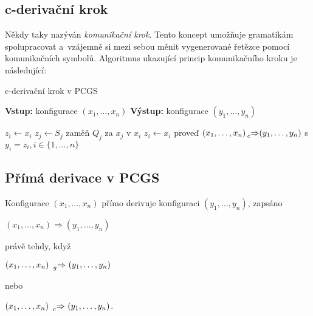 \subsection*{c-derivační krok}\label{kap_c_der_krok}
Někdy taky nazýván \emph{komunikační krok}. Tento koncept umožňuje gramatikám spolupracovat a~vzájemně si mezi sebou měnit vygenerované řetězce pomocí komunikačních symbolů.
Algoritmus ukazující princip komunikačního kroku je následující:
\begin{algorithm}[h]
\caption{c-derivační krok v PCGS}\label{alg_c_der_krok}
\begin{algorithmic}[1]
    \State \textbf{Vstup:} konfigurace $(x_1, \ldots, x_n)$
    \State \textbf{Výstup:} konfigurace $(y_1, \ldots, y_n)$
    \State 

        \State $z_i \gets x_i$
    \EndFor 
                \State $z_j \gets S_j$
                \State zaměň $Q_j$ za $x_j$ v $x_i$
                \State $z_i \gets x_i$ 
            \EndFor
        \EndIf
    \EndFor
    \State proveď $(x_1, \ldots, x_n) \prescript{}{c}{\Rightarrow} (y_1, \ldots, y_n)$ s $y_i = z_i, i \in \{1, \ldots, n\}$ 
\end{algorithmic}
\end{algorithm}

\subsection*{Přímá derivace v PCGS}
\begin{definition}
    Konfigurace $(x_1, \ldots, x_n)$ přímo derivuje konfiguraci $(y_1, \ldots, y_n)$, zapsáno
    \begin{center}
        $(x_1, \ldots, x_n) \Rightarrow (y_1, \ldots, y_n)$
    \end{center} 
    právě tehdy, když
    \begin{center}
        $(x_1, \ldots, x_n)\ \prescript{}{g}{\Rightarrow}\ (y_1, \ldots, y_n)$
    \end{center}
    nebo
    \begin{center}
        $(x_1, \ldots, x_n)\ \prescript{}{c}{\Rightarrow}\ (y_1, \ldots, y_n)$.
    \end{center}
\end{definition}

